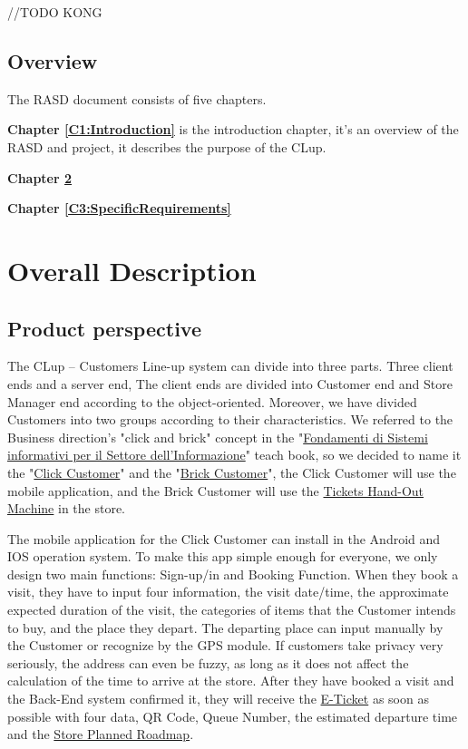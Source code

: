 \documentclass[a4paper,12pt]{report}
\begin{document}
//TODO KONG
\section{Overview}
The RASD document consists of five chapters.

\textbf{Chapter \ref{C1:Introduction}} is the introduction chapter, it's an overview of the RASD and project, 
it describes the purpose of the CLup.

\textbf{Chapter \ref{C2:OverallDescription}} 

\textbf{Chapter \ref{C3:SpecificRequirements}} 



\chapter{Overall Description} \label{C2:OverallDescription}
\section{Product perspective}

The CLup – Customers Line-up system can divide into three parts. Three client ends and a server end, The client ends are divided into Customer end and Store Manager end according to the object-oriented. Moreover, we have divided Customers into two groups according to their characteristics. We referred to the Business direction's "click and brick" concept in the "\hyperref[Reference documents]{Fondamenti di Sistemi informativi per il Settore dell'Informazione}" teach book, so we decided to name it the "\hyperref[Definitions]{Click Customer}" and the "\hyperref[Definitions]{Brick Customer}", the Click Customer will use the mobile application, and the Brick Customer will use the \hyperref[Definitions]{Tickets Hand-Out Machine} in the store.

The mobile application for the Click Customer can install in the Android and IOS operation system. To make this app simple enough for everyone, we only design two main functions: Sign-up/in and Booking Function. When they book a visit, they have to input four information, the visit date/time, the approximate expected duration of the visit, the categories of items that the Customer intends to buy, and the place they depart. The departing place can input manually by the Customer or recognize by the GPS module. If customers take privacy very seriously, the address can even be fuzzy, as long as it does not affect the calculation of the time to arrive at the store. After they have booked a visit and the Back-End system confirmed it, they will receive the \hyperref[Definitions]{E-Ticket} as soon as possible with four data, QR Code, Queue Number, the estimated departure time and the \hyperref[Definitions]{Store Planned Roadmap}. 
\end{document}
